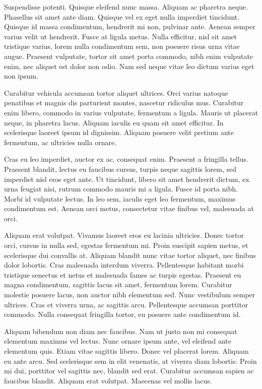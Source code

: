 Suspendisse potenti. Quisque eleifend nunc massa. Aliquam ac pharetra neque. Phasellus sit amet ante diam. Quisque vel ex eget nulla imperdiet tincidunt. Quisque id massa condimentum, hendrerit mi non, pulvinar ante. Aenean semper varius velit ut hendrerit. Fusce at ligula metus. Nulla efficitur, nisl sit amet tristique varius, lorem nulla condimentum sem, non posuere risus urna vitae augue. Praesent vulputate, tortor sit amet porta commodo, nibh enim vulputate enim, nec aliquet est dolor non odio. Nam sed neque vitae leo dictum varius eget non ipsum.

Curabitur vehicula accumsan tortor aliquet ultrices. Orci varius natoque penatibus et magnis dis parturient montes, nascetur ridiculus mus. Curabitur enim libero, commodo in varius vulputate, fermentum a ligula. Mauris ut placerat neque, in pharetra lacus. Aliquam iaculis eu quam sit amet efficitur. In scelerisque laoreet ipsum id dignissim. Aliquam posuere velit pretium ante fermentum, ac ultricies nulla ornare.

Cras eu leo imperdiet, auctor ex ac, consequat enim. Praesent a fringilla tellus. Praesent blandit, lectus eu faucibus cursus, turpis neque sagittis lorem, sed imperdiet nisl eros eget ante. Ut tincidunt, libero sit amet hendrerit dictum, ex urna feugiat nisi, rutrum commodo mauris mi a ligula. Fusce id porta nibh. Morbi id vulputate lectus. In leo sem, iaculis eget leo fermentum, maximus condimentum est. Aenean orci metus, consectetur vitae finibus vel, malesuada at orci.

Aliquam erat volutpat. Vivamus laoreet eros eu lacinia ultricies. Donec tortor orci, cursus in nulla sed, egestas fermentum mi. Proin suscipit sapien metus, et scelerisque dui convallis at. Aliquam blandit nunc vitae tortor aliquet, nec finibus dolor lobortis. Cras malesuada interdum viverra. Pellentesque habitant morbi tristique senectus et netus et malesuada fames ac turpis egestas. Praesent eu magna condimentum, sagittis lacus sit amet, fermentum lorem. Curabitur molestie posuere lacus, non auctor nibh elementum sed. Nunc vestibulum semper ultrices. Cras et viverra urna, ac sagittis arcu. Pellentesque accumsan porttitor commodo. Nulla consequat fringilla tortor, eu posuere ante condimentum id.

Aliquam bibendum non diam nec faucibus. Nam ut justo non mi consequat elementum maximus vel lectus. Nunc ornare ipsum ante, vel eleifend ante elementum quis. Etiam vitae sagittis libero. Donec vel placerat lorem. Aliquam eu ante arcu. Sed scelerisque sem in elit venenatis, at viverra diam lobortis. Proin mi dui, porttitor vel sagittis nec, blandit sed erat. Curabitur accumsan sapien ac faucibus blandit. Aliquam erat volutpat. Maecenas vel mollis lacus.

